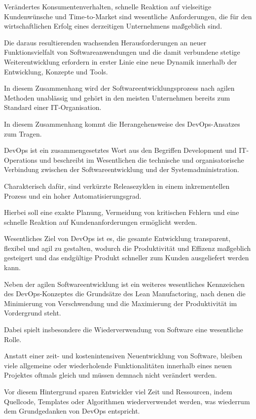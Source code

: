 Verändertes Konsumentenverhalten, schnelle Reaktion auf vielseitige Kundenwünsche und Time-to-Market sind wesentliche Anforderungen, die für den wirtschaftlichen Erfolg eines derzeitigen Unternehmens maßgeblich sind.

Die daraus resultierenden wachsenden Herausforderungen an neuer Funktionsvielfalt von Softwareanwendungen und die damit verbundene stetige Weiterentwicklung erfordern in erster Linie eine neue Dynamik innerhalb der Entwicklung, Konzepte und Tools. 

In diesem Zusammenhang wird der Softwareentwicklungsprozess nach agilen Methoden unablässig und gehört in den meisten Unternehmen bereits zum Standard einer IT-Organisation. 

In diesem Zusammenhang kommt die Herangehensweise des DevOps-Ansatzes zum Tragen.

DevOps ist ein zusammengesetztes Wort aus den Begriffen Development und IT-Operations und beschreibt im Wesentlichen die technische und organisatorische Verbindung zwischen der Softwareentwicklung und der Systemadministration.\cite[S.23]{alt_innovationsorientiertes_2017}

Charakterisch dafür, sind verkürzte Releasezyklen in einem inkrementellen Prozess und ein hoher Automatisierungsgrad. 

Hierbei soll eine exakte Planung, Vermeidung von kritischen Fehlern und eine schnelle Reaktion auf Kundenanforderungen ermöglicht werden.

Wesentliches Ziel von DevOps ist es, die gesamte Entwicklung transparent, flexibel und agil zu gestalten, wodurch die Produktivität und Effizenz maßgeblich gesteigert und das endgültige Produkt schneller zum Kunden ausgeliefert werden kann.\cite{hemon_agile_2020}  

Neben der agilen Softwareentwicklung ist ein weiteres wesentliches Kennzeichen des DevOps-Konzeptes die Grundsätze des Lean Manufactoring, nach denen die Minimierung von Verschwendung und die Maximierung der Produktivität im Vordergrund steht.\cite{samulat_raus_2017}

Dabei spielt insbesondere die Wiederverwendung von Software eine wesentliche Rolle.

Anstatt einer zeit- und kostenintensiven Neuentwicklung von Software, bleiben viele allgemeine oder wiederholende Funktionalitäten innerhalb eines neuen Projektes oftmals gleich und müssen demnach nicht verändert werden.

Vor diesem Hintergrund sparen Entwickler viel Zeit und Ressourcen, indem Quellcode, Templates oder Algorithmen wiederverwendet werden, was wiederrum dem Grundgedanken von DevOps entspricht. 

